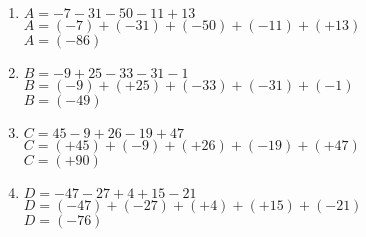 \documentclass[11pt]{article}
\begin{document}
\begin{exercicedevoir}
\begin{multicols}{2}
\begin{enumerate}[itemsep=1em,label={}]
\item  $ A = -7-31-50-11+13$\\$ A = (-7) + (-31) + (-50) + (-11) + (+13)$ \\$ A = (-86)$
\item  $ B = -9+25-33-31-1$\\$ B = (-9) + (+25) + (-33) + (-31) + (-1)$ \\$ B = (-49)$
\item  $ C = 45-9+26-19+47$\\$ C = (+45) + (-9) + (+26) + (-19) + (+47)$ \\$ C = (+90)$
\item  $ D = -47-27+4+15-21$\\$ D = (-47) + (-27) + (+4) + (+15) + (-21)$ \\$ D = (-76)$
\end{enumerate}
\end{multicols}
\end{exercicedevoir}
\end{document}
